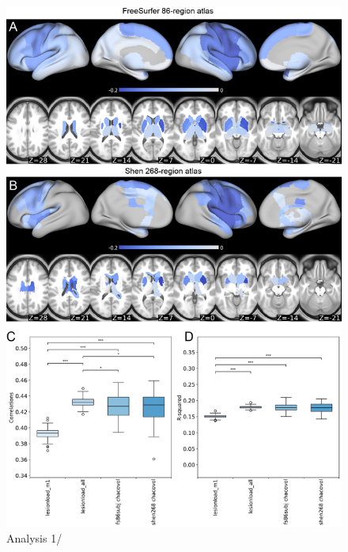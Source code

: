 \documentclass[10pt]{article}
\begin{document}
\begin{figure}[htp]
\centering
\includegraphics[width=1.0\linewidth]{figures/Analysis1.png}
\caption{Analysis 1/}
\label{nemotool}
\end{figure}
\end{document}
